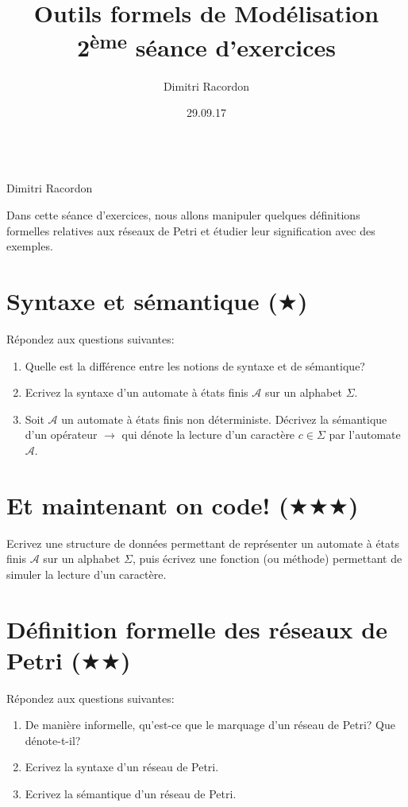 \documentclass[a4paper, titlepage]{article}
\makeatletter
\numberwithin{figure}{section}
\numberwithin{table}{section}
\newcommand\objective[1]{\def\@objective{#1}}
\newcommand{\makecustomtitle}{%
	\begin{center}
		\huge\@title \\
		[1ex]\small Dimitri Racordon \\ \@date
	\end{center}
	\@objective
}
\makeatother
\begin{document}
  \title{Outils formels de Modélisation \\ 2\textsuperscript{ème} séance d'exercices}
  \author{Dimitri Racordon}
  \date{29.09.17}
	\objective{
		Dans cette séance d'exercices, nous allons manipuler quelques définitions formelles
		relatives aux réseaux de Petri et étudier leur signification avec des exemples.
	}

	\makecustomtitle

  \section{Syntaxe et sémantique ($\bigstar$)}
		Répondez aux questions suivantes:
		\begin{enumerate}
			\item Quelle est la différence entre les notions de syntaxe et de sémantique?
			\item Ecrivez la syntaxe d'un automate à états finis $\mathcal{A}$ sur un alphabet $\Sigma$.
			\item Soit $\mathcal{A}$ un automate à états finis non déterministe.
            Décrivez la sémantique d'un opérateur $\rightarrow$ qui dénote la lecture
            d'un caractère $c\in\Sigma$ par l'automate $\mathcal{A}$.
		\end{enumerate}

  \section{Et maintenant on code! ($\bigstar\bigstar\bigstar$)}
    Ecrivez une structure de données permettant de représenter un automate à états finis
    $\mathcal{A}$ sur un alphabet $\Sigma$, puis écrivez une fonction (ou méthode)
    permettant de simuler la lecture d'un caractère.

  \section{Définition formelle des réseaux de Petri ($\bigstar\bigstar$)}
		Répondez aux questions suivantes:
		\begin{enumerate}
			\item De manière informelle, qu'est-ce que le marquage d'un réseau de Petri? Que dénote-t-il?
			\item Ecrivez la syntaxe d'un réseau de Petri.
			\item Ecrivez la sémantique d'un réseau de Petri.
		\end{enumerate}
\end{document}

